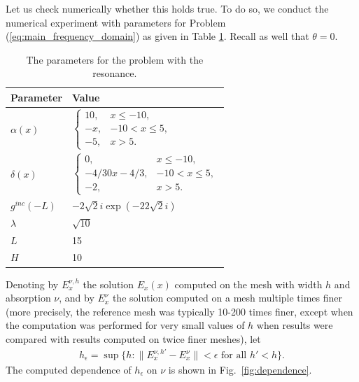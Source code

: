 Let us check numerically whether this holds true. 
To do so, we conduct the  numerical experiment with parameters for Problem 
(\ref{eq:main_frequency_domain}) as given in Table \ref{tab:parameters}. Recall as well that $\theta=0$. 
\begin{table}[htb!]
\begin{tabular}{l|l}
Parameter & Value \\
\hline
$\alpha(x)$ & $\left\{\begin{array}{lr}
10, & x\leq -10,\\
-x, & -10<x\leq 5,\\
-5, & x>5.
\end{array}\right.$ \\
$\delta(x)$ & 
$\left\{\begin{array}{lr}
0, & x\leq -10,\\
-4/30x-4/3,& -10<x\leq 5,\\
-2, & x>5.
\end{array}\right.$ \\
$g^{inc}(-L)$ & $-2 \sqrt{2}i\exp(-22\sqrt{2}i)$\\
$\lambda$ & 
$\sqrt{10}$\\
$L$& 15\\
$H$ & 10 \\
\end{tabular}
\caption{The parameters for the problem with the resonance.}
\label{tab:parameters}
\end{table}
Denoting by $E_{x}^{\nu,h}$ the solution $E_{x}(x)$ computed on the mesh with width $h$ and 
 absorption $\nu$, and by $E_{x}^{\nu}$ the solution computed on a mesh multiple times finer (more precisely, the reference mesh
was typically 10-200 times finer, except when the computation was performed for very small values of $h$ when results were compared with results computed on twice finer meshes), let 
\begin{align}
\label{eq:def_epsilon}
h_{\epsilon}=\sup\{h: \|E_{x}^{\nu,h'}-E_{x}^{\nu}\|<\epsilon \text{ for all } h'<h\}.
\end{align}
The computed dependence of $h_{\epsilon}$ on $\nu$ is shown in Fig.~\ref{fig:dependence}.
